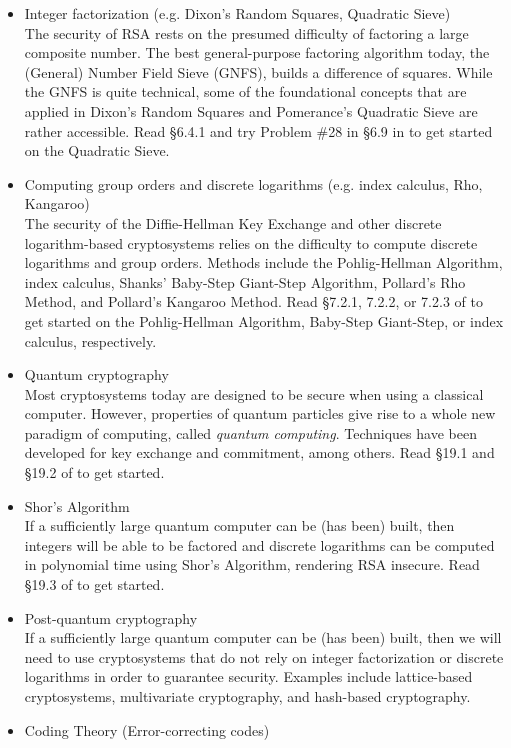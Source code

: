\begin{itemize}
		\item{Integer factorization (e.g. Dixon’s Random Squares, Quadratic Sieve)}\\
		The security of RSA rests on the presumed difficulty of factoring a large composite number. The best general-purpose factoring algorithm today, the (General) Number Field Sieve (GNFS), builds a difference of squares. While the GNFS is quite technical, some of the foundational concepts that are applied in Dixon's Random Squares and Pomerance's Quadratic Sieve are rather accessible. Read \S 6.4.1 and try Problem \#28 in \S 6.9 in \cite{tw} to get started on the Quadratic Sieve.
		\item{Computing group orders and discrete logarithms (e.g. index calculus, Rho, Kangaroo)}\\
		The security of the Diffie-Hellman Key Exchange and other discrete logarithm-based cryptosystems relies on the difficulty to compute discrete logarithms and group orders. Methods include the Pohlig-Hellman Algorithm, index calculus, Shanks' Baby-Step Giant-Step Algorithm, Pollard's Rho Method, and Pollard's Kangaroo Method. Read \S 7.2.1, 7.2.2, or 7.2.3 of \cite{tw} to get started on the Pohlig-Hellman Algorithm, Baby-Step Giant-Step, or index calculus, respectively.
		\item{Quantum cryptography}\\
		Most cryptosystems today are designed to be secure when using a classical computer. However, properties of quantum particles give rise to a whole new paradigm of computing, called {\em quantum computing}. Techniques have been developed for key exchange and commitment, among others. Read \S 19.1 and \S19.2 of \cite{tw} to get started.
		\item{Shor's Algorithm}\\
		If a sufficiently large quantum computer can be (has been) built, then integers will be able to be factored and discrete logarithms can be computed in polynomial time using Shor's Algorithm, rendering RSA insecure. Read \S 19.3 of \cite{tw} to get started.
		\item{Post-quantum cryptography}\\
		If a sufficiently large quantum computer can be (has been) built, then we will need to use cryptosystems that do not rely on integer factorization or discrete logarithms in order to guarantee security. Examples include lattice-based cryptosystems, multivariate cryptography, and hash-based cryptography.
		\item{Coding Theory (Error-correcting codes)}\\

\end{itemize}
